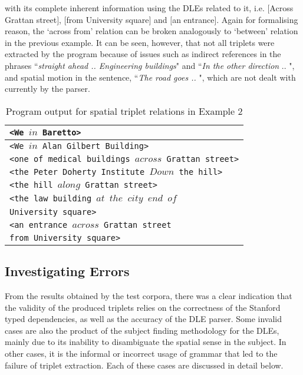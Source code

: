 \documentclass{acm_proc_article-sp}
\begin{document}
with its complete inherent information using the DLEs related to it, i.e. $[$Across Grattan street$]$, $[$from University square$]$ and $[$an entrance$]$. Again for formalising reason, the `across from' relation can be broken analogously to `between' relation in the previous example. It can be seen, however, that not all triplets were extracted by the program because of issues such as indirect references in the phrases ``\textit{straight ahead .. Engineering buildings}" and ``\textit{In the other direction} .. ", and spatial motion in the sentence, ``\textit{The road goes .. }", which are not dealt with currently by the parser. 
\begin{table}
\begin{tabular}{|l|}
\hline
\texttt{<We $in$ Baretto>}\\ \hline
\texttt{<We $in$  Alan Gilbert Building>}\\ \hline
\texttt{<one of medical buildings $across$ Grattan street>}\\ \hline
\texttt{<the Peter Doherty Institute $Down$ the hill>}\\ \hline
\texttt{<the hill $along$ Grattan street>}\\ \hline
\texttt{<the law building $at$  $the$ $city$ $end$ $of$ }\\
\texttt{University square>}\\ \hline
\texttt{<an entrance $across$  Grattan street} \\
\texttt{from University square>}\\ \hline
\end{tabular}
\caption{Program output for spatial triplet relations in Example 2}
\label{table:ex2}
\end{table}
\subsection{Investigating Errors}
From the results obtained by the test corpora, there was a clear indication that the validity of the produced triplets relies on the correctness of the Stanford typed dependencies, as well as the accuracy of the DLE parser. Some invalid cases are also the product of the subject finding methodology for the DLEs, mainly due to its inability to disambiguate the spatial sense in the subject. In other cases, it is the informal or incorrect usage of grammar that led to the failure of triplet extraction. Each of these cases are discussed in detail below. 
\end{document}

